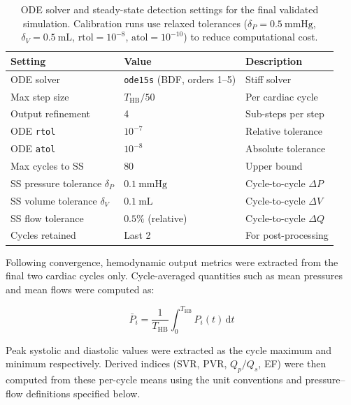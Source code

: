 \documentclass{article}
\begin{document}
\begin{table}[ht]
\centering
\caption{ODE solver and steady-state detection settings for
         the final validated simulation. Calibration runs use
         relaxed tolerances ($\delta_P = 0.5\ \mathrm{mmHg}$,
         $\delta_V = 0.5\ \mathrm{mL}$, $\mathrm{rtol} = 10^{-8}$,
         $\mathrm{atol} = 10^{-10}$) to reduce computational cost.}
\label{tab:sim_settings}
\begin{tabular}{lll}
\toprule
\textbf{Setting} & \textbf{Value} & \textbf{Description} \\
\midrule
ODE solver              & \texttt{ode15s} (BDF, orders 1–5) & Stiff solver \\
Max step size           & $T_\mathrm{HB}/50$               & Per cardiac cycle \\
Output refinement       & 4                                 & Sub-steps per step \\
ODE \texttt{rtol}       & $10^{-7}$                        & Relative tolerance \\
ODE \texttt{atol}       & $10^{-8}$                        & Absolute tolerance \\
Max cycles to SS        & 80                                & Upper bound \\
SS pressure tolerance $\delta_P$ & $0.1\ \mathrm{mmHg}$  & Cycle-to-cycle $\Delta P$ \\
SS volume tolerance $\delta_V$   & $0.1\ \mathrm{mL}$    & Cycle-to-cycle $\Delta V$ \\
SS flow tolerance       & $0.5\%$ (relative)                & Cycle-to-cycle $\Delta Q$ \\
Cycles retained         & Last 2                            & For post-processing \\
\bottomrule
\end{tabular}
\end{table}

Following convergence, hemodynamic output metrics were extracted
from the final two cardiac cycles only. Cycle-averaged quantities
such as mean pressures and mean flows were computed as:

\begin{equation}
    \bar{P}_i = \frac{1}{T_\mathrm{HB}}
                \int_0^{T_\mathrm{HB}} P_i(t)\, \mathrm{d}t
    \label{eq:mean_pressure}
\end{equation}

Peak systolic and diastolic values were extracted as the
cycle maximum and minimum respectively. Derived indices
(SVR, PVR, $Q_p/Q_s$, EF) were then computed from these
per-cycle means using the unit conventions and pressure--flow definitions
specified below.
\end{document}
